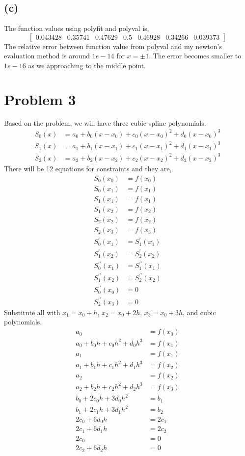 \documentclass{article}
\newcommand{\bmat}[1]{\begin{bmatrix} #1 \end{bmatrix}}
\begin{document}
\subsection*{(c)}
The function values using polyfit and polyval is,
$$\bmat{0.043428    &  0.35741 &     0.47629    &      0.5 &     0.46928  &    0.34266   &  0.039373}$$
The relative error between function value from polyval and my newton's evaluation method is around $1e-14$ for $x= \pm1$.
The error becomes smaller to $1e-16$ as we approaching to the middle point.


\section*{Problem 3}
Based on the problem, we will have three cubic spline polynomials.
\begin{align}
    S_0(x) &= a_0 + b_0(x-x_0) + c_0(x-x_0)^2 + d_0(x-x_0)^3 \nonumber \\
    S_1(x) &= a_1 + b_1(x-x_1) + c_1(x-x_1)^2 + d_1(x-x_1)^3 \nonumber \\
    S_2(x) &= a_2 + b_2(x-x_2) + c_2(x-x_2)^2 + d_2(x-x_2)^3 \nonumber
\end{align}
There will be 12 equations for constraints and they are,
\begin{align}{}
    S_0(x_0) &= f(x_0) \\
    S_0(x_1) &= f(x_1)  \\ 
    S_1(x_1) &= f(x_1) \\
    S_1(x_2) &= f(x_2)  \\
    S_2(x_2) &= f(x_2) \\
    S_2(x_3) &= f(x_3) \\
    S_0^\prime(x_1) &= S_1^\prime(x_1) \\
    S_1^\prime(x_2) &= S_2^\prime(x_2) \\
    S_0^{\prime\prime}(x_1) &= S_1^{\prime\prime}(x_1) \\
    S_1^{\prime\prime}(x_2) &= S_2^{\prime\prime}(x_2) \\
    S_0^{\prime\prime}(x_0) &= 0\\
    S_2^{\prime\prime}(x_3) &= 0
\end{align}
Substitute all with $x_1 = x_0 + h$, $x_2 = x_0+ 2h$, $x_3 = x_0 + 3h$, and cubic polynomials.
\setcounter{equation}{0}
\begin{align}
    a_0 &= f(x_0) \\
    a_0 + b_0h + c_0h^2 + d_0h^3 &= f(x_1) \\
    a_1 &= f(x_1)\\
    a_1 + b_1h + c_1h^2 + d_1h^3 &= f(x_2) \\
    a_2 &= f(x_2)\\
    a_2 + b_2h + c_2h^2 + d_2h^3 &= f(x_3) \\
    b_0 + 2c_0h + 3d_0h^2 &= b_1 \\
    b_1 + 2c_1h + 3d_1h^2 &= b_2 \\
    2c_0 + 6d_0h &= 2c_1\\
    2c_1 + 6d_1h &= 2c_2\\
    2c_0 &= 0\\
    2c_2 + 6d_2h &= 0
\end{align}
\end{document}
